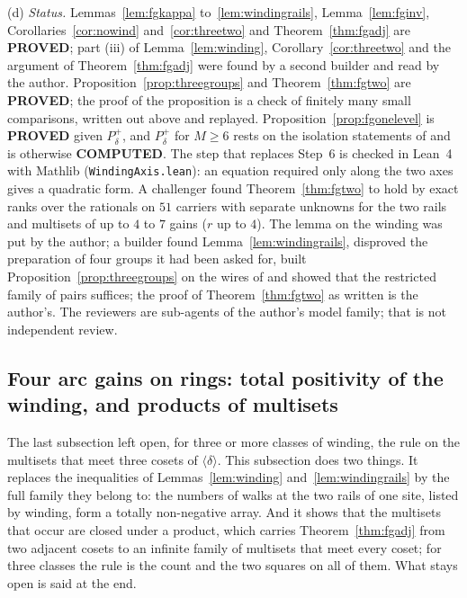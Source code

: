 \begin{remark}
(d) \emph{Status.} Lemmas~\ref{lem:fgkappa} to~\ref{lem:windingrails}, Lemma~\ref{lem:fginv}, Corollaries~\ref{cor:nowind} and~\ref{cor:threetwo} and Theorem~\ref{thm:fgadj} are \textbf{PROVED}; part (iii) of Lemma~\ref{lem:winding}, Corollary~\ref{cor:threetwo} and the argument of Theorem~\ref{thm:fgadj} were found by a second builder and read by the author. Proposition~\ref{prop:threegroups} and Theorem~\ref{thm:fgtwo} are \textbf{PROVED}; the proof of the proposition is a check of finitely many small comparisons, written out above and replayed. Proposition~\ref{prop:fgonelevel} is \textbf{PROVED} given $P^{+}_\delta$, and $P^{+}_\delta$ for $M\ge6$ rests on the isolation statements of \cite{dgone} and is otherwise \textbf{COMPUTED}. The step that replaces Step~6 is checked in Lean~4 with Mathlib (\texttt{WindingAxis.lean}): an equation required only along the two axes gives a quadratic form. A challenger found Theorem~\ref{thm:fgtwo} to hold by exact ranks over the rationals on $51$ carriers with separate unknowns for the two rails and multisets of up to $4$ to $7$ gains ($r$ up to $4$). The lemma on the winding was put by the author; a builder found Lemma~\ref{lem:windingrails}, disproved the preparation of four groups it had been asked for, built Proposition~\ref{prop:threegroups} on the wires of \cite{dgone} and showed that the restricted family of pairs suffices; the proof of Theorem~\ref{thm:fgtwo} as written is the author's. The reviewers are sub-agents of the author's model family; that is not independent review.
\end{remark}

\subsection{Four arc gains on rings: total positivity of the winding, and products of multisets}

The last subsection left open, for three or more classes of winding, the rule on the multisets that meet three cosets of $\langle\delta\rangle$. This subsection does two things. It replaces the inequalities of Lemmas~\ref{lem:winding} and~\ref{lem:windingrails} by the full family they belong to: the numbers of walks at the two rails of one site, listed by winding, form a totally non-negative array. And it shows that the multisets that occur are closed under a product, which carries Theorem~\ref{thm:fgadj} from two adjacent cosets to an infinite family of multisets that meet every coset; for three classes the rule is the count and the two squares on all of them. What stays open is said at the end.

